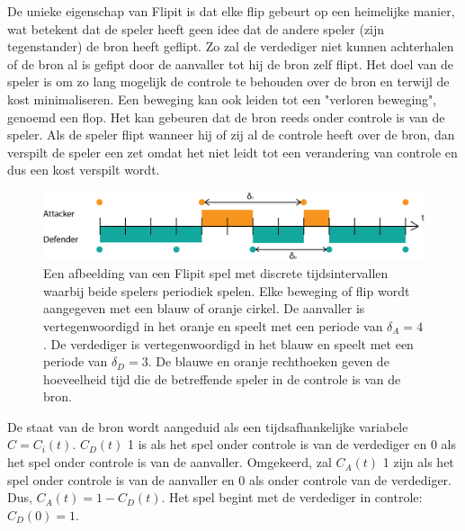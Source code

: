 \documentclass[master=cws, masteroption=vs]{kulemt}
\begin{document}
\begin{abstract*}
De unieke eigenschap van Flipit is dat elke flip gebeurt op een heimelijke manier, wat betekent dat de speler heeft geen idee dat de andere speler (zijn tegenstander) de bron heeft geflipt. Zo zal de verdediger niet kunnen achterhalen of de bron al is gefipt door de aanvaller tot hij de bron zelf flipt. Het doel van de speler is om zo lang mogelijk de controle te behouden over de bron en terwijl de kost minimaliseren. Een beweging kan ook leiden tot een "verloren beweging", genoemd een flop. Het kan gebeuren dat de bron reeds onder controle is van de speler. Als de speler flipt wanneer hij of zij al de controle  heeft over de bron, dan verspilt de speler een zet omdat het niet leidt tot een verandering van controle en dus een kost verspilt wordt. \\


\begin{figure}[hbtp]
\center
\includegraphics[scale=0.5]{../../doc/template/Images/DefFlipit}
\caption{Een afbeelding van een Flipit spel met discrete tijdsintervallen waarbij beide spelers periodiek spelen. Elke beweging of flip wordt aangegeven met een blauw of oranje cirkel. De aanvaller is vertegenwoordigd in het oranje en speelt met een periode van $ \delta_{A} = 4 $. De verdediger is vertegenwoordigd in het blauw en speelt met een periode van $ \delta_{D} = 3 $. De blauwe en oranje rechthoeken geven de hoeveelheid tijd die de betreffende speler in de controle is van de bron.}
\label{fig: FLipItDefault}
\end{figure}



De staat van de bron wordt aangeduid als een tijdsafhankelijke variabele $ C = C_{i}(t) $.
$ C_{D}(t) $ 1 is als het spel onder controle is van de verdediger en 0 als het spel onder controle is van de aanvaller. Omgekeerd, zal $ C_{A}(t) $ 1 zijn als het spel onder controle is van de aanvaller en 0 als onder controle van de verdediger. Dus, $ C_{A}(t) = 1 - C_{D}(t) $.
Het spel begint met de verdediger in controle: $ C_{D}(0) = 1 $. \\



\end{abstract*}
\end{document}
